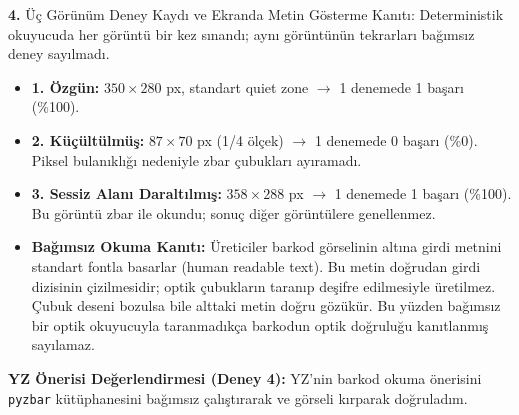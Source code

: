 \documentclass[10pt,a4paper]{article}
\begin{document}
\textbf{4.} Üç Görünüm Deney Kaydı ve Ekranda Metin Gösterme Kanıtı:
Deterministik okuyucuda her görüntü bir kez sınandı; aynı görüntünün tekrarları bağımsız deney sayılmadı.
\begin{itemize}
    \item \textbf{1. Özgün:} $350\times 280$ px, standart quiet zone $\rightarrow$ 1 denemede 1 başarı (\%100).
    \item \textbf{2. Küçültülmüş:} $87\times 70$ px (1/4 ölçek) $\rightarrow$ 1 denemede 0 başarı (\%0). Piksel bulanıklığı nedeniyle zbar çubukları ayıramadı.
    \item \textbf{3. Sessiz Alanı Daraltılmış:} $358\times 288$ px $\rightarrow$ 1 denemede 1 başarı (\%100). Bu görüntü zbar ile okundu; sonuç diğer görüntülere genellenmez.
    \item \textbf{Bağımsız Okuma Kanıtı:} Üreticiler barkod görselinin altına girdi metnini standart fontla basarlar (human readable text). Bu metin doğrudan girdi dizisinin çizilmesidir; optik çubukların taranıp deşifre edilmesiyle üretilmez. Çubuk deseni bozulsa bile alttaki metin doğru gözükür. Bu yüzden bağımsız bir optik okuyucuyla taranmadıkça barkodun optik doğruluğu kanıtlanmış sayılamaz.
\end{itemize}
\textbf{YZ Önerisi Değerlendirmesi (Deney 4):} YZ'nin barkod okuma önerisini \texttt{pyzbar} kütüphanesini bağımsız çalıştırarak ve görseli kırparak doğruladım.

\newpage
\end{document}
